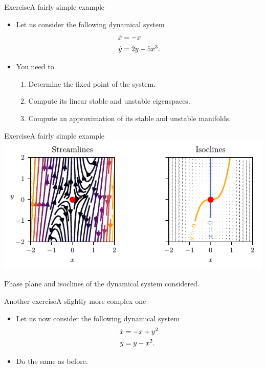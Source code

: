 \documentclass[usenames,dvipsnames,svgnames,10pt,aspectratio=169]{beamer}
\begin{document}
\begin{frame}[t, c]{Exercise}{A fairly simple example}
	\begin{itemize}
		\item Let us consider the following dynamical system
		\begin{equation}
			\begin{aligned}
				\dot{x} & = -x \\
				\dot{y} & = 2y - 5x^3.
			\end{aligned}
			\notag
		\end{equation}

		\bigskip

		\item You need to
		\begin{enumerate}
			\item Determine the fixed point of the system.
			\item Compute its linear stable and unstable eigenspaces.
			\item Compute an approximation of its stable and unstable manifolds.
		\end{enumerate}
	\end{itemize}

	\vspace{1cm}
\end{frame}

\begin{frame}[t, c]{Exercise}{A fairly simple example}
	\centering
	\includegraphics[width=.75\textwidth]{exercise_phase_plane}

	Phase plane and isoclines of the dynamical system considered.

	\vspace{1cm}
\end{frame}

\begin{frame}[t, c]{Another exercise}{A slightly more complex one}
	\begin{itemize}
		\item Let us now consider the following dynamical system
		\begin{equation}
			\begin{aligned}
				\dot{x} & = -x + y^2 \\
				\dot{y} & = y -x^2.
			\end{aligned}
			\notag
		\end{equation}

		\bigskip

		\item Do the same as before.
	\end{itemize}

	\vspace{1cm}
\end{frame}
\end{document}
